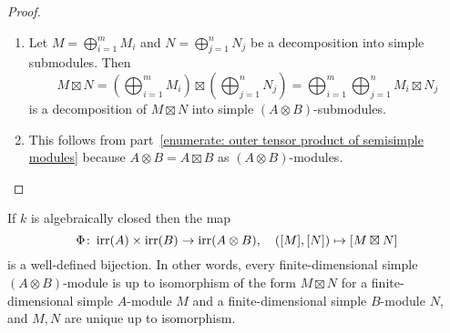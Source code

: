 \begin{proof}
  \leavevmode
  \begin{enumerate}
    \item
      Let $M = \bigoplus_{i=1}^m M_i$ and $N = \bigoplus_{j=1}^n N_j$ be a decomposition into simple submodules.
      Then
      \[
          M \mathbin{\boxtimes} N
        = \left( \bigoplus_{i=1}^m M_i \right) \mathbin{\boxtimes} \left( \bigoplus_{j=1}^n N_j \right)
        = \bigoplus_{i=1}^m \bigoplus_{j=1}^n M_i \mathbin{\boxtimes} N_j
      \]
      is a decomposition of $M \mathbin{\boxtimes} N$ into simple $(A \otimes B)$-submodules.
    \item
      This follows from part~\ref*{enumerate: outer tensor product of semisimple modules} because $A \otimes B = A \mathbin{\boxtimes} B$ as $(A \otimes B)$-modules.
    \qedhere
  \end{enumerate}
\end{proof}




\begin{theorem}
  If $k$ is algebraically closed then the map
  \[
            \Phi
    \colon  \operatorname{irr}(A) \times \operatorname{irr}(B)
    \to     \operatorname{irr}(A \otimes B),
    \quad   ([M],[N])
    \mapsto [M \mathbin{\boxtimes} N]
  \]
  is a well-defined bijection.
  In other words, every finite-dimensional simple $(A \otimes B)$-module is up to isomorphism of the form $M \mathbin{\boxtimes} N$ for a finite-dimensional simple $A$-module $M$ and a finite-dimensional simple $B$-module $N$, and $M, N$ are unique up to isomorphism.
\end{theorem}



